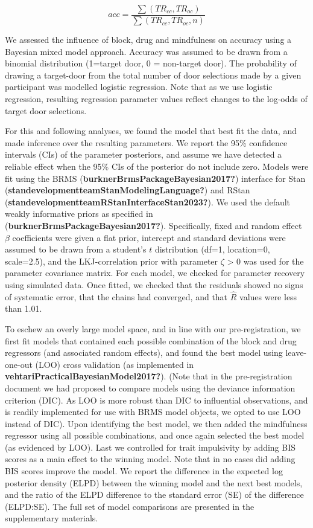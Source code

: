 \documentclass{article}
\begin{document}
\[
acc = \frac{\sum{(TR_{cc}, TR_{oc})}}{\sum{(TR_{cc}, TR_{oc}, n)}}
\]

We assessed the influence of block, drug and mindfulness on accuracy
using a Bayesian mixed model approach. Accuracy was assumed to be drawn
from a binomial distribution (1=target door, 0 = non-target door). The
probability of drawing a target-door from the total number of door
selections made by a given participant was modelled logistic regression.
Note that as we use logistic regression, resulting regression parameter
values reflect changes to the log-odds of target door selections.

For this and following analyses, we found the model that best fit the
data, and made inference over the resulting parameters. We report the
95\% confidence intervals (CIs) of the parameter posteriors, and assume
we have detected a reliable effect when the 95\% CIs of the posterior do
not include zero. Models were fit using the BRMS
(\textbf{burknerBrmsPackageBayesian2017?}) interface for Stan
(\textbf{standevelopmentteamStanModelingLanguage?}) and RStan
(\textbf{standevelopmentteamRStanInterfaceStan2023?}). We used the
default weakly informative priors as specified in
(\textbf{burknerBrmsPackageBayesian2017?}). Specifically, fixed and
random effect \(\beta\) coefficients were given a flat prior, intercept
and standard deviations were assumed to be drawn from a student's \(t\)
distribution (df=1, location=0, scale=2.5), and the LKJ-correlation
prior with parameter \(\zeta\) \textgreater{} 0 was used for the
parameter covariance matrix. For each model, we checked for parameter
recovery using simulated data. Once fitted, we checked that the
residuals showed no signs of systematic error, that the chains had
converged, and that \(\hat{R}\) values were less than 1.01.

To eschew an overly large model space, and in line with our
pre-registration, we first fit models that contained each possible
combination of the block and drug regressors (and associated random
effects), and found the best model using leave-one-out (LOO) cross
validation (as implemented in
\textbf{vehtariPracticalBayesianModel2017?}). (Note that in the
pre-registration document we had proposed to compare models using the
deviance information criterion (DIC). As LOO is more robust than DIC to
influential observations, and is readily implemented for use with BRMS
model objects, we opted to use LOO instead of DIC). Upon identifying the
best model, we then added the mindfulness regressor using all possible
combinations, and once again selected the best model (as evidenced by
LOO). Last we controlled for trait impulsivity by adding BIS scores as a
main effect to the winning model. Note that in no cases did adding BIS
scores improve the model. We report the difference in the expected log
posterior density (ELPD) between the winning model and the next best
models, and the ratio of the ELPD difference to the standard error (SE)
of the difference (ELPD:SE). The full set of model comparisons are
presented in the supplementary materials.
\end{document}
